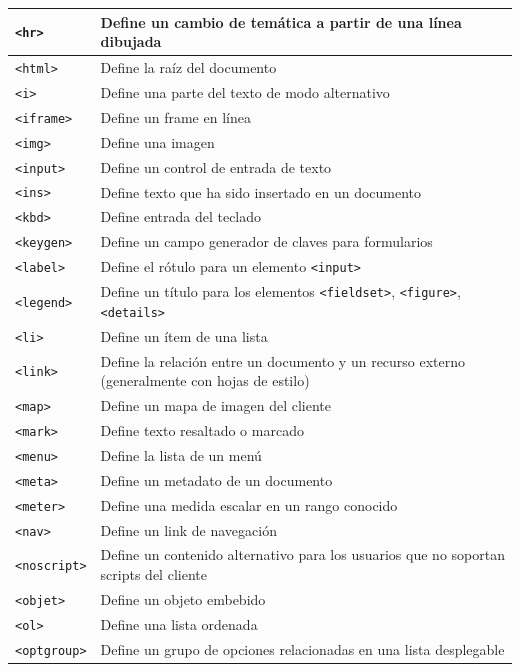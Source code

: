 \documentclass[11pt]{scrartcl}
\begin{document}
\begin{longtable}{|p{}|p{}|}
\hline
\texttt{<hr>} & Define un cambio de temática a partir de una línea dibujada \\
\hline
\texttt{<html>} & Define la raíz del documento \\
\hline
\texttt{<i>} & Define una parte del texto de modo alternativo \\
\hline
\texttt{<iframe>} & Define un frame en línea \\
\hline
\texttt{<img>} & Define una imagen \\
\hline
\texttt{<input>} & Define un control de entrada de texto \\
\hline
\texttt{<ins>} & Define texto que ha sido insertado en un documento \\
\hline
\texttt{<kbd>} & Define entrada del teclado \\
\hline
\texttt{<keygen>} & Define un campo generador de claves para formularios \\
\hline
\texttt{<label>} & Define el rótulo para un elemento \texttt{<input>} \\
\hline
\texttt{<legend>} & Define un título para los elementos \texttt{<fieldset>}, \texttt{<figure>}, \texttt{<details>} \\
\hline
\texttt{<li>} & Define un ítem de una lista \\
\hline
\texttt{<link>} & Define la relación entre un documento y un recurso externo (generalmente con hojas de estilo) \\
\hline
\texttt{<map>} & Define un mapa de imagen del cliente \\
\hline
\texttt{<mark>} & Define texto resaltado o marcado \\
\hline
\texttt{<menu>} & Define la lista de un menú \\
\hline
\texttt{<meta>} & Define un metadato de un documento \\
\hline
\texttt{<meter>} & Define una medida escalar en un rango conocido \\
\hline
\texttt{<nav>} & Define un link de navegación \\
\hline
\texttt{<noscript>} & Define un contenido alternativo para los usuarios que no soportan scripts del cliente \\
\hline
\texttt{<objet>} & Define un objeto embebido \\
\hline
\texttt{<ol>} & Define una lista ordenada \\
\hline
\texttt{<optgroup>} & Define un grupo de opciones relacionadas en una lista desplegable \\
\hline

\end{longtable}
\end{document}
